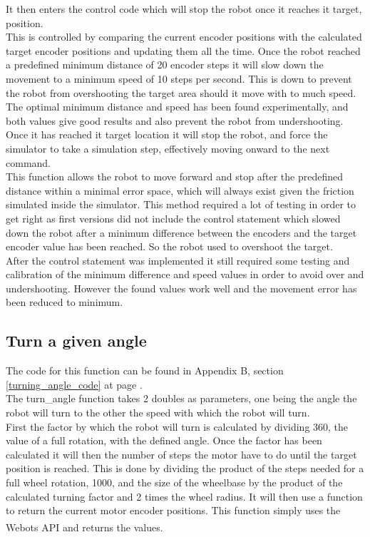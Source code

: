 It then enters the control code which will stop the robot once it reaches it target, position. \\
This is controlled by comparing the current encoder positions with the calculated target encoder positions and updating them all the time.
Once the robot reached a predefined minimum distance of 20 encoder steps it will slow down the movement to a minimum speed of 10 steps per second. This is down to prevent the robot from overshooting the target area should it move with to much speed. The optimal minimum distance and speed has been found experimentally, and both values give good results and also prevent the robot from undershooting.
Once it has reached it target location it will stop the robot, and force the simulator to take a simulation step, effectively moving onward to the next command.\\[3ex]

This function allows the robot to move forward and stop after the predefined distance within a minimal error space, which will always exist given the friction simulated inside the simulator. This method required a lot of testing in order to get right as first versions did not include the control statement which slowed down the robot after a minimum difference between the encoders and the target encoder value has been reached. So the robot used to overshoot the target. \\
After the control statement was implemented it still required some testing and calibration of the minimum difference and speed values in order to avoid over and undershooting. However the found values work well and the movement error has been reduced to minimum.\\

\subsection{Turn a given angle}
\label{turn_angle_description}
The code for this function can be found in Appendix B, section \ref{turning_angle_code} at page \pageref{turning_angle_code}.\\
The turn\_angle function takes 2 doubles as parameters, one being the angle the robot will turn to the other the speed with which the robot will turn.\\
First the factor by which the robot will turn is calculated by dividing 360, the value of a full rotation, with the defined angle.
Once the factor has been calculated it will then the number of steps the motor have to do until the target position is reached. This is done by dividing the product of the steps needed for a full wheel rotation, 1000, and the size of the wheelbase by the product of the calculated turning factor and 2 times the wheel radius. It will then use a function to return the current motor encoder positions. This function simply uses the Webots\textsuperscript{\texttrademark}  API and returns the values. \\[3ex]

